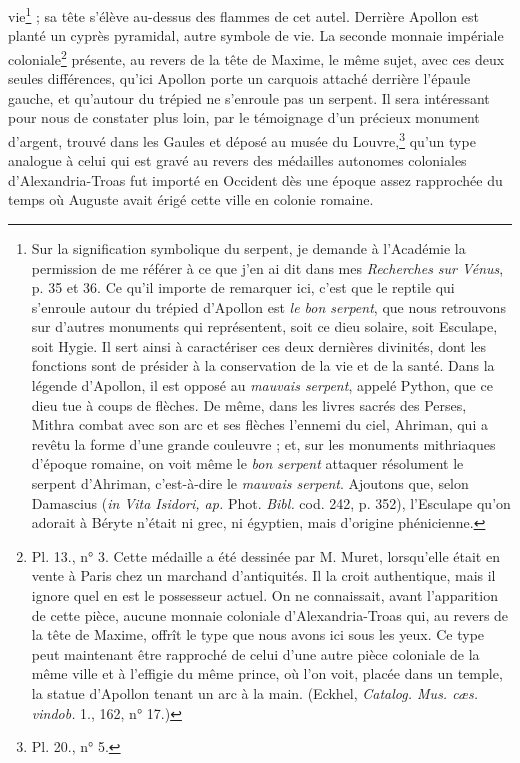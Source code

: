 \documentclass{article}
\begin{document}
vie\footnote{Sur la signification symbolique du serpent, je demande à l'Académie la permission de me référer à ce que j'en ai dit dans mes \emph{Recherches sur Vénus}, p. 35 et 36. Ce qu'il importe de remarquer ici, c'est que le reptile qui s'enroule autour du trépied d'Apollon est \emph{le bon serpent}, que nous retrouvons sur d'autres monuments qui représentent, soit ce dieu solaire, soit Esculape, soit Hygie. Il sert ainsi à caractériser ces deux dernières divinités, dont les fonctions sont de présider à la conservation de la vie et de la santé. Dans la légende d'Apollon, il est opposé au \emph{mauvais serpent}, appelé Python, que ce dieu tue à coups de flèches. De même, dans les livres sacrés des Perses, Mithra combat avec son arc et ses flèches l'ennemi du ciel, Ahriman, qui a revêtu la forme d'une grande couleuvre ; et, sur les monuments mithriaques d'époque romaine, on voit même le \emph{bon serpent} attaquer résolument le serpent d'Ahriman, c'est-à-dire le \emph{mauvais serpent}. Ajoutons que, selon Damascius (\emph{in Vita Isidori, ap.} Phot. \emph{Bibl.} cod. 242, p. 352), l'Esculape qu'on adorait à Béryte n'était ni grec, ni égyptien, mais d'origine phénicienne.} ; sa tête s'élève au-dessus des flammes de cet autel. Derrière Apollon est planté un cyprès pyramidal, autre symbole de vie. La seconde monnaie impériale coloniale\footnote{Pl. 13., n° 3. Cette médaille a été dessinée par M. Muret, lorsqu'elle était en vente à Paris chez un marchand d'antiquités. Il la croit authentique, mais il ignore quel en est le possesseur actuel. On ne connaissait, avant l'apparition de cette pièce, aucune monnaie coloniale d'Alexandria-Troas qui, au revers de la tête de Maxime, offrît le type que nous avons ici sous les yeux. Ce type peut maintenant être rapproché de celui d'une autre pièce coloniale de la même ville et à l'effigie du même prince, où l'on voit, placée dans un temple, la statue d'Apollon tenant un arc à la main. (Eckhel, \emph{Catalog. Mus. cæs. vindob.} 1., 162, n° 17.)} présente, au revers de la tête de Maxime, le même sujet, avec ces deux seules différences, qu'ici Apollon porte un carquois attaché derrière l'épaule gauche, et qu'autour du trépied ne s'enroule pas un serpent. Il sera intéressant pour nous de constater plus loin, par le témoignage d'un précieux monument d'argent, trouvé dans les Gaules et déposé au musée du Louvre,\footnote{Pl. 20., n° 5.} qu'un type analogue à celui qui est gravé au revers des médailles autonomes coloniales d'Alexandria-Troas fut importé en Occident dès une époque assez rapprochée du temps où Auguste avait érigé cette ville en colonie romaine.
\end{document}
